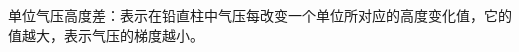 \documentclass{article}
\author{Yangang Cao}
\begin{document}
\noindent 单位气压高度差：表示在铅直柱中气压每改变一个单位所对应的高度变化值，它的值越大，表示气压的梯度越小。
\\
\\
\end{document}
